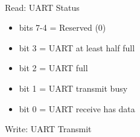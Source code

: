 \\
Read: UART Status\\
\begin{itemize}
\item[] bits 7-4 = Reserved (0)
\item[] bit 3 = UART at least half full
\item[] bit 2 = UART full
\item[] bit 1 = UART transmit busy
\item[] bit 0 = UART receive has data
\end{itemize}
Write: UART Transmit

